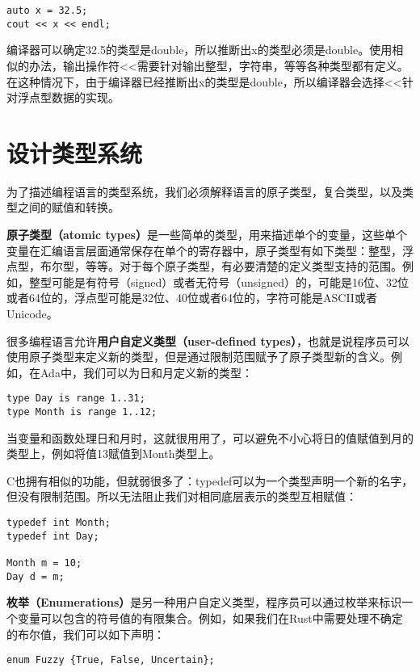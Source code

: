 \documentclass[cn,11pt,chinese]{elegantbook}
\begin{document}
\begin{verbatim}
auto x = 32.5;
cout << x << endl;
\end{verbatim}

编译器可以确定32.5的类型是double，所以推断出x的类型必须是double。使用相似的办法，输出操作符<<需要针对输出整型，字符串，等等各种类型都有定义。在这种情况下，由于编译器已经推断出x的类型是double，所以编译器会选择<<针对浮点型数据的实现。

\section{设计类型系统}

为了描述编程语言的类型系统，我们必须解释语言的原子类型，复合类型，以及类型之间的赋值和转换。

\textbf{原子类型（atomic types）}是一些简单的类型，用来描述单个的变量，这些单个变量在汇编语言层面通常保存在单个的寄存器中，原子类型有如下类型：整型，浮点型，布尔型，等等。对于每个原子类型，有必要清楚的定义类型支持的范围。例如，整型可能是有符号（signed）或者无符号（unsigned）的，可能是16位、32位或者64位的，浮点型可能是32位、40位或者64位的，字符可能是ASCII或者Unicode。

很多编程语言允许\textbf{用户自定义类型（user-defined types）}，也就是说程序员可以使用原子类型来定义新的类型，但是通过限制范围赋予了原子类型新的含义。例如，在Ada中，我们可以为日和月定义新的类型：

\begin{verbatim}
type Day is range 1..31;
type Month is range 1..12;
\end{verbatim}

当变量和函数处理日和月时，这就很用用了，可以避免不小心将日的值赋值到月的类型上，例如将值13赋值到Month类型上。

C也拥有相似的功能，但就弱很多了：typedef可以为一个类型声明一个新的名字，但没有限制范围。所以无法阻止我们对相同底层表示的类型互相赋值：

\begin{verbatim}
typedef int Month;
typedef int Day;

Month m = 10;
Day d = m;
\end{verbatim}

\textbf{枚举（Enumerations）}是另一种用户自定义类型，程序员可以通过枚举来标识一个变量可以包含的符号值的有限集合。例如，如果我们在Rust中需要处理不确定的布尔值，我们可以如下声明：

\begin{verbatim}
enum Fuzzy {True, False, Uncertain};
\end{verbatim}
\end{document}
